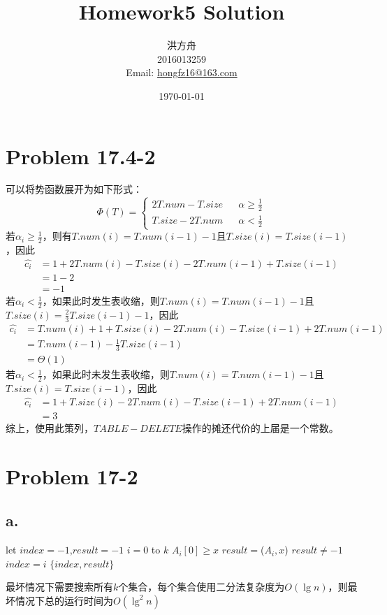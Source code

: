 \documentclass{article}
\title{Homework5 Solution}
\author{洪方舟\\2016013259\\Email: \href{mailto:hongfz16@163.com}{hongfz16@163.com}}
\date{\today}
\begin{document}
  \maketitle
  \setlength\parindent{0em}
  \section*{Problem 17.4-2}
  	可以将势函数展开为如下形式：
  	\begin{equation*}
  		\Phi(T)=\left\{
  		\begin{array}{rcl}
  		2T.num-T.size &	& {\alpha \geq \frac{1}{2}} \\
  		T.size-2T.num &	& {\alpha < \frac{1}{2}}
  		\end{array}
  		\right.
  	\end{equation*}
  	若$\alpha_i \geq \frac{1}{2}$，则有$T.num(i)=T.num(i-1)-1$且$T.size(i)=T.size(i-1)$，因此
  	\begin{align*}
	  	\hat{c_i} &= 1+2T.num(i)-T.size(i)-2T.num(i-1)+T.size(i-1) \\
	  	&= 1-2 \\
	  	&= -1
  	\end{align*}
  	若$\alpha_i<\frac{1}{2}$，如果此时发生表收缩，则$T.num(i)=T.num(i-1)-1$且$T.size(i)=\frac{2}{3}T.size(i-1)-1$，因此
  	\begin{align*}
	  	\hat{c_i} &= T.num(i)+1+T.size(i)-2T.num(i)-T.size(i-1)+2T.num(i-1) \\
	  	&= T.num(i-1)-\frac{1}{3}T.size(i-1) \\
	  	&= \Theta(1)
  	\end{align*}
  	若$\alpha_i<\frac{1}{2}$，如果此时未发生表收缩，则$T.num(i)=T.num(i-1)-1$且$T.size(i)=T.size(i-1)$，因此
  	\begin{align*}
	  	\hat{c_i} &= 1+T.size(i)-2T.num(i)-T.size(i-1)+2T.num(i-1) \\
	  	&= 3
  	\end{align*}
  	综上，使用此策列，$TABLE-DELETE$操作的摊还代价的上届是一个常数。
  	
  	\section*{Problem 17-2}
  		\subsection*{a.}
	  		\begin{codebox}
  				\li let $index=-1$,$result=-1$
  				\li \For $i=0$ to $k$
  				\li \Do \If $A_i[0] \geq x$
  				\li \Then $result=$($A_i,x$)
  				\li \If $result \neq -1$
  				\li \Then $index=i$
  				\li {}
  				\End
  				\End
  				\End
  				\li {} $\{index,result\}$
  			\end{codebox}
  			最坏情况下需要搜索所有$k$个集合，每个集合使用二分法复杂度为$O(\lg n)$，则最坏情况下总的运行时间为$O(\lg^2 n)$
\end{document}
